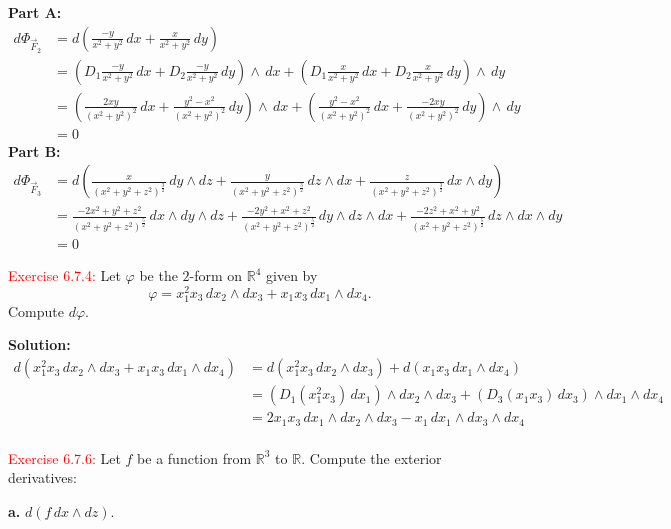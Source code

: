 \documentclass[12pt]{article}
\newcommand{\RR}{\mathbb{R}}
\begin{document}
\textbf{Part A:}
\begin{align*}
    d\Phi_{\vec F_2 }
    &= d \left(\frac{-y}{x^2+y^2}\,dx + \frac{x}{x^2+y^2}\,dy\right) \\
    &= \left(D_1 \frac{-y}{x^2+y^2}\,dx + D_2 \frac{-y}{x^2+y^2}\,dy \right)\wedge \,dx + 
        \left(D_1 \frac{x}{x^2+y^2}\,dx + D_2 \frac{x}{x^2+y^2}\,dy\right)\wedge \,dy \\
    &= \left(\frac{2xy}{(x^2+y^2)^2}\,dx + \frac{y^2-x^2}{(x^2+y^2)^2}\,dy \right)\wedge \,dx +
        \left(\frac{y^2-x^2}{(x^2+y^2)^2}\,dx + \frac{-2xy}{(x^2+y^2)^2}\,dy\right)\wedge \,dy \\
    &= 0
\end{align*}
\textbf{Part B:}
\begin{align*}
    d\Phi_{\vec F_3}
    &= d \left(\frac{x}{(x^2+y^2+z^2)^\frac{3}{2}}\,dy\wedge dz + \frac{y}{(x^2+y^2+z^2)^\frac{3}{2}}\,dz \wedge dx + \frac{z}{(x^2+y^2+z^2)^\frac{3}{2}}\,dx\wedge dy\right) \\
    &= \frac{-2x^2+y^2+z^2}{(x^2 + y^2+z^2)^\frac{5}{2}}\,dx\wedge dy\wedge dz + \frac{-2y^2+x^2+z^2}{(x^2 + y^2+z^2)^\frac{5}{2}}\,dy\wedge dz\wedge dx + \frac{-2z^2+x^2+y^2}{(x^2 + y^2+z^2)^\frac{5}{2}}\,dz\wedge dx\wedge dy \\
    &= 0
\end{align*}


\textcolor{red}{Exercise 6.7.4:}
Let $\varphi$ be the $2$-form on $\RR^4$ given
by
\begin{equation*}
    \varphi = x_1^2 x_3 \, dx_2 \wedge dx_3 + x_1 x_3 \, dx_1 \wedge dx_4 .
\end{equation*}
Compute $d\varphi$.
\smallskip

\textbf{Solution:}
\begin{align*}
    d(x_1^2 x_3 \, dx_2 \wedge dx_3 + x_1 x_3 \, dx_1 \wedge dx_4)
    &= d(x_1^2 x_3 \, dx_2 \wedge dx_3) + d(x_1 x_3 \, dx_1 \wedge dx_4) \\
    &= (D_1(x_1^2 x_3)\, dx_1) \wedge dx_2 \wedge dx_3 +
        (D_3(x_1 x_3)\, dx_3) \wedge dx_1 \wedge dx_4\\
    &= 2x_1 x_3 \,dx_1 \wedge dx_2 \wedge dx_3 -
        x_1 \,dx_1 \wedge dx_3 \wedge dx_4\\
\end{align*}

\textcolor{red}{Exercise 6.7.6:}
Let $f$ be a function from $\RR^3$ to $\RR$. Compute the exterior derivatives:

\textbf{a.} $d(f\, dx\wedge dz)$.
\end{document}
